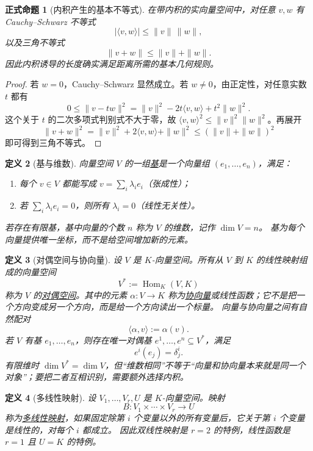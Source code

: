 \documentclass[UTF8,fontset=none,a4paper,11pt]{ctexart}
\theoremstyle{foundation-definition}
\newtheorem{definition}{定义}[section]
\theoremstyle{foundation-theorem}
\theoremstyle{foundation-proposition}
\newtheorem{proposition}[definition]{正式命题}
\theoremstyle{foundation-example}
\theoremstyle{foundation-remark}
\theoremstyle{foundation-theorem}
\newcommand{\term}[2]{\hyperref[#1]{#2}}
\begin{document}
\begin{proposition}[内积产生的基本不等式]\label{prop:inner-product-inequalities}
在带内积的实向量空间中，对任意 \(v,w\) 有 Cauchy--Schwarz 不等式
\[
|\langle v,w\rangle|\leq\|v\|\,\|w\|,
\]
以及三角不等式
\[
\|v+w\|\leq\|v\|+\|w\|.
\]
因此内积诱导的长度确实满足距离所需的基本几何规则。
\end{proposition}

\begin{proof}
若 \(w=0\)，Cauchy--Schwarz 显然成立。若 \(w\ne0\)，由正定性，对任意实数 \(t\) 都有
\[
0\leq\|v-tw\|^2
=\|v\|^2-2t\langle v,w\rangle+t^2\|w\|^2.
\]
这个关于 \(t\) 的二次多项式判别式不大于零，故
\(\langle v,w\rangle^2\leq\|v\|^2\|w\|^2\)。再展开
\[
\|v+w\|^2=\|v\|^2+2\langle v,w\rangle+\|w\|^2
\leq(\|v\|+\|w\|)^2
\]
即可得到三角不等式。
\end{proof}

\begin{definition}[基与维数]\label{def:basis-dimension}
向量空间 \(V\) 的一组\term{def:basis-dimension}{基}是一个向量组
\((e_1,\dots,e_n)\)，满足：
\begin{enumerate}[label=(\alph*)]
  \item 每个 \(v\in V\) 都能写成 \(v=\sum_i\lambda_i e_i\)（张成性）；
  \item 若 \(\sum_i\lambda_i e_i=0\)，则所有 \(\lambda_i=0\)（线性无关性）。
\end{enumerate}
若存在有限基，基中向量的个数 \(n\) 称为 \(V\) 的维数，记作 \(\dim V=n\)。
基为每个向量提供唯一坐标，而不是给空间增加新的元素。
\end{definition}

\begin{definition}[对偶空间与协向量]\label{def:dual-space}\label{def:covector}
设 \(V\) 是 \(K\)-向量空间。所有从 \(V\) 到 \(K\) 的线性映射组成的向量空间
\[
V^*:=\operatorname{Hom}_K(V,K)
\]
称为 \(V\) 的\term{def:dual-space}{对偶空间}。其中的元素 \(\alpha:V\to K\) 称为\term{def:covector}{协向量}或线性函数；它不是把一个方向变成另一个方向，而是给一个方向读出一个标量。
向量与协向量之间有自然配对
\[
\langle\alpha,v\rangle:=\alpha(v).
\]
若 \(V\) 有基 \(e_1,\ldots,e_n\)，则存在唯一对偶基 \(e^1,\ldots,e^n\subseteq V^*\)，满足
\[
e^i(e_j)=\delta^i_j.
\]
有限维时 \(\dim V^*=\dim V\)，但“维数相同”不等于“向量和协向量本来就是同一个对象”；要把二者互相识别，需要额外选择内积。
\end{definition}

\begin{definition}[多线性映射]\label{def:multilinear-map}
设 \(V_1,\ldots,V_r,U\) 是 \(K\)-向量空间。映射
\[
B:V_1\times\cdots\times V_r\longrightarrow U
\]
称为\term{def:multilinear-map}{多线性映射}，如果固定除第 \(i\) 个变量以外的所有变量后，它关于第 \(i\) 个变量是线性的，对每个 \(i\) 都成立。
因此双线性映射是 \(r=2\) 的特例，线性函数是 \(r=1\) 且 \(U=K\) 的特例。
\end{definition}
\end{document}
